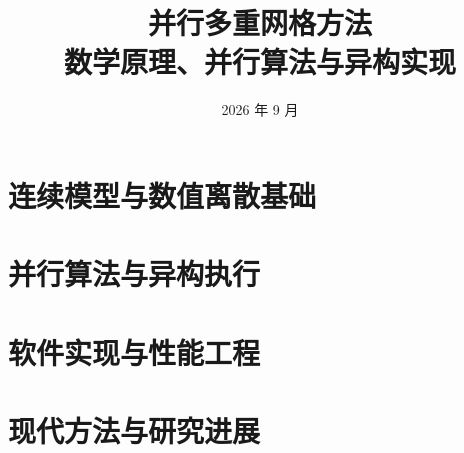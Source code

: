 \documentclass[11pt,openany]{ctexbook}
\title{\Huge 并行多重网格方法\\[0.6em]\Large 数学原理、并行算法与异构实现}
\author{}
\date{2026 年 9 月}
\begin{document}
\let\cleardoublepage\clearpage
\frontmatter
\maketitle

\tableofcontents
\mainmatter

\part{连续模型与数值离散基础}








\part{并行算法与异构执行}








\part{软件实现与性能工程}





\part{现代方法与研究进展}



\appendix





\backmatter

\printbibliography[heading=bibintoc,title={参考文献与项目文档}]
\end{document}

